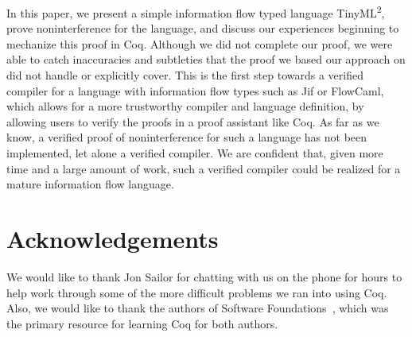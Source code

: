\documentclass[a4paper,twocolumn]{article}
\newcommand{\langName}[0]{TinyML\textsuperscript{2}}
\theoremstyle{plain}
\theoremstyle{definition}
\begin{document}
In this paper, we present a simple information flow typed language \langName,
prove noninterference for the language, and discuss our experiences beginning to
mechanize this proof in Coq.  Although we did not complete our proof, we were
able to catch inaccuracies and subtleties that the proof we based our approach
on did not handle or explicitly cover.  This is the first step towards a
verified compiler for a language with information flow types such as Jif or
FlowCaml, which allows for a more trustworthy compiler and language definition,
by allowing users to verify the proofs in a proof assistant like Coq.  As far as
we know, a verified proof of noninterference for such a language has not been
implemented, let alone a verified compiler.  We are confident that, given more
time and a large amount of work, such a verified compiler could be realized for
a mature information flow language.

\section*{Acknowledgements}

We would like to thank Jon Sailor for chatting with us on the phone for hours to
help work through some of the more difficult problems we ran into using Coq.
Also, we would like to thank the authors of Software
Foundations~\cite{Pierce:sf}, which was the primary resource for learning Coq
for both authors.



\end{document}
